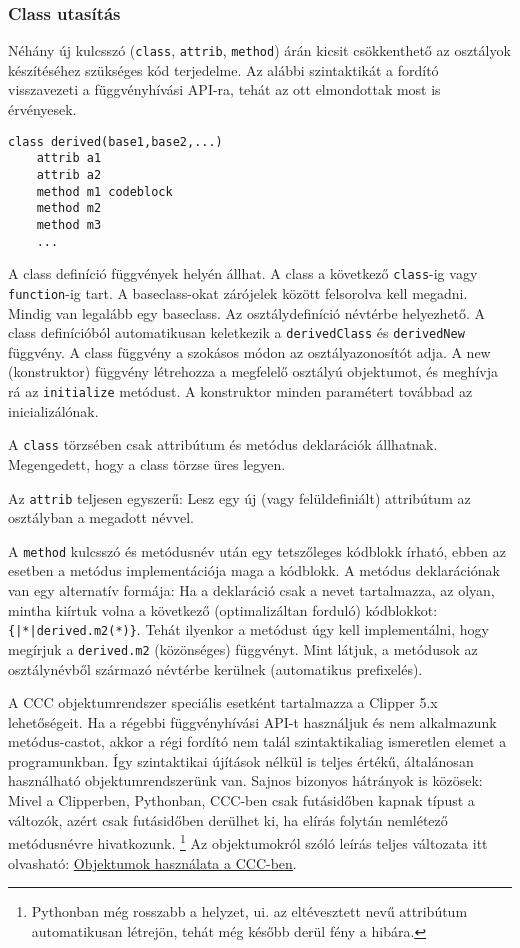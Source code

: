 \subsubsection{Class utasítás}

Néhány új kulcsszó (\verb!class!, \verb!attrib!, \verb!method!)
árán kicsit csökkenthető az osztályok készítéséhez szükséges kód
terjedelme. Az alábbi szintaktikát a fordító visszavezeti
a függvényhívási API-ra, tehát az ott elmondottak most is érvényesek.

\begin{verbatim}
class derived(base1,base2,...)
    attrib a1
    attrib a2
    method m1 codeblock
    method m2 
    method m3
    ...
\end{verbatim}
A class definíció  függvények helyén állhat.
A class a következő \verb!class!-ig vagy \verb!function!-ig tart.
A  baseclass-okat zárójelek között felsorolva kell megadni.
Mindig van legalább egy baseclass.
Az osztálydefiníció  névtérbe helyezhető.
A class definícióból automatikusan keletkezik a
\verb!derivedClass! és \verb!derivedNew! függvény. 
A class függvény a szokásos módon az osztályazonosítót adja.
A new (konstruktor) függvény létrehozza a megfelelő osztályú objektumot, 
és meghívja rá az \verb!initialize! metódust.
A konstruktor minden paramétert továbbad az inicializálónak.

A \verb!class! törzsében csak attribútum és metódus deklarációk
állhatnak. Megengedett, hogy a class törzse üres legyen.

Az \verb!attrib! teljesen egyszerű: Lesz egy új (vagy
felüldefiniált) attribútum az osztályban a megadott névvel.

A \verb!method! kulcsszó és metódusnév után egy tetszőleges kódblokk írható,
ebben az esetben a metódus implementációja maga a kódblokk.
A metódus deklarációnak van egy  alternatív formája:
Ha a deklaráció csak a nevet tartalmazza,
az olyan, mintha kiírtuk volna a következő
(optimalizáltan forduló) kódblokkot: \verb!{|*|derived.m2(*)}!. 
Tehát ilyenkor a metódust úgy kell implementálni, 
hogy megírjuk a \verb!derived.m2! (közönséges) függvényt. 
Mint látjuk,  a metódusok az osztálynévből származó 
névtérbe kerülnek (automatikus prefixelés).

A CCC objektumrendszer  speciális esetként tartalmazza
a Clipper 5.x lehetőségeit. Ha a régebbi függvényhívási
API-t használjuk és nem alkalmazunk metódus-castot, 
akkor a régi fordító nem talál szintaktikaliag ismeretlen
elemet a programunkban. Így szintaktikai újítások nélkül is
teljes értékű, általánosan használható objektumrendszerünk van.
Sajnos bizonyos hátrányok is közösek: Mivel a Clipperben, Pythonban, CCC-ben
csak futásidőben kapnak típust a változók, azért csak futásidőben
derülhet ki, ha elírás folytán nemlétező metódusnévre hivatkozunk.%
\footnote{Pythonban még rosszabb a helyzet, ui. az eltévesztett nevű 
attribútum automatikusan létrejön, tehát még később derül fény a hibára.}
Az objektumokról szóló leírás teljes változata itt olvasható:
\href{objektum.html}{Objektumok használata a CCC-ben}.

